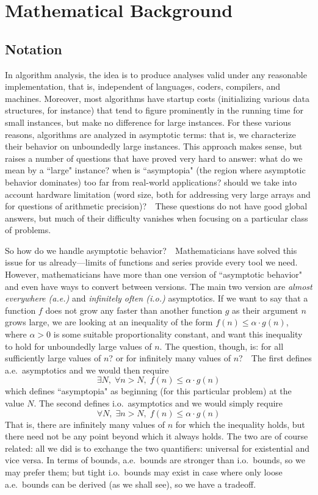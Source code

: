 \documentclass{article}
\begin{document}
\section{Mathematical Background}

\subsection{Notation}
In algorithm analysis, the idea is to produce analyses valid under any
reasonable implementation, that is, independent of languages, coders, compilers,
and machines.  Moreover, most algorithms have startup costs (initializing
various data structures, for instance) that tend to figure prominently
in the running time for small instances, but make no difference for large
instances.  For these various reasons, algorithms are analyzed in asymptotic
terms: that is, we characterize their behavior on unboundedly large instances.
This approach makes sense, but raises a number of questions that have proved
very hard to answer: what do we mean by a ``large" instance?  when is ``asymptopia" (the region where asymptotic behavior dominates) too far from real-world
applications? should we take into account hardware limitation (word size,
both for addressing very large arrays and for questions of arithmetic
precision)?\ \ These questions do not have good global answers, but much
of their difficulty vanishes when focusing on a particular class of problems.

So how do we handle asymptotic behavior?\ \ Mathematicians have solved this
issue for us already---limits of functions and series provide every tool we
need.  However, mathematicians have more than one version of ``asymptotic
behavior" and even have ways to convert between versions.  The main two version
are \emph{almost everywhere (a.e.)} and \emph{infinitely often (i.o.)}
asymptotics.  If we want to say that a function $f$ does not grow any faster
than another function $g$ as their argument $n$ grows large, we are looking
at an inequality of the form $f(n) \leq \alpha\cdot g(n)$, where $\alpha>0$
is some suitable proportionality constant, and want this inequality to hold
for unboundedly large values of $n$.   The question, though, is: for all
sufficiently large values of $n$? or for infinitely many values of $n$?\ \
The first defines a.e.\ asymptotics and we would then require
  $$\exists N,\;\forall n>N,\;f(n)\leq\alpha\cdot g(n)$$
which defines ``asymptopia" as beginning (for this particular problem) at
the value $N$.  The second defines i.o.\ asymptotics and we would simply
require
  $$\forall N,\;\exists n>N,\;f(n)\leq\alpha\cdot g(n)$$
That is, there are infinitely many values of $n$ for which the inequality
holds, but there need not be any point beyond which it always holds.
The two are of course related: all we did is to exchange the two quantifiers:
universal for existential and vice versa.  In terms of bounds, a.e.\ bounds
are stronger than i.o.\ bounds, so we may prefer them; but tight i.o.\ bounds
may exist in case where only loose a.e.\ bounds can be derived (as we shall
see), so we have a tradeoff.
\end{document}
